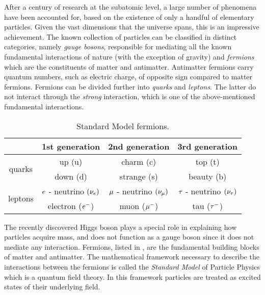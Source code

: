 
After a century of research at the subatomic level, a large number of phenomena have been accounted
for, based on the existence of only a handful of elementary particles. Given the vast dimensions that the
universe spans, this is an impressive achievement. The known collection of particles can be classified
in distinct categories, namely {\it gauge bosons}, responsible for mediating all the known fundamental
interactions of nature (with the exception of gravity) and {\it fermions} which are the constituents
of matter and antimatter. Antimatter fermions carry quantum numbers, such as electric charge, of opposite
sign compared to matter fermions. Fermions can be divided further into {\it quarks}
and {\it leptons}. The latter do not interact through the {\it strong} interaction, which is
one of the above-mentioned fundamental interactions.

\begin{table}[h!]
  \centering
 \begin{tabular}{cccc}
   \hline
                            &  1st generation                     &   2nd generation              &  3rd generation    \\
   \hline
   \multirow{2}{*}{quarks}  &  up (u)                             &   charm (c)                   &  top (t)           \\
                            &  down (d)                           &   strange (s)                 &  beauty (b)        \\
   \hline
   \multirow{2}{*}{leptons} &   $e$ - neutrino $(\nu_e)$  &  $\mu$ - neutrino $(\nu_\mu)$  &  $\tau$ - neutrino $(\nu_\tau)$  \\
                            &   electron ($e^-$)                  &   muon ($\mu^-$)               &  tau ($\tau^-$)     \\
   \hline
 \end{tabular}
 \caption{Standard Model fermions.}
 \label{quarksLeptons}
\end{table}

\noindent The recently discovered Higgs
boson \cite{higgs-cms,higgs-atlas} plays a special role in explaining how particles acquire mass,
and does not function as a gauge boson since it does not mediate any interaction. Fermions,
listed in , are the fundamental building blocks of matter and antimatter.
The mathematical framework necessary to describe the interactions between the fermions is called the
\textit{Standard Model} of Particle Physics \cite{sm-glashow,sm-weinberg,sm-salam} which is a quantum
field theory. In this framework particles are treated as excited states of their underlying field.

